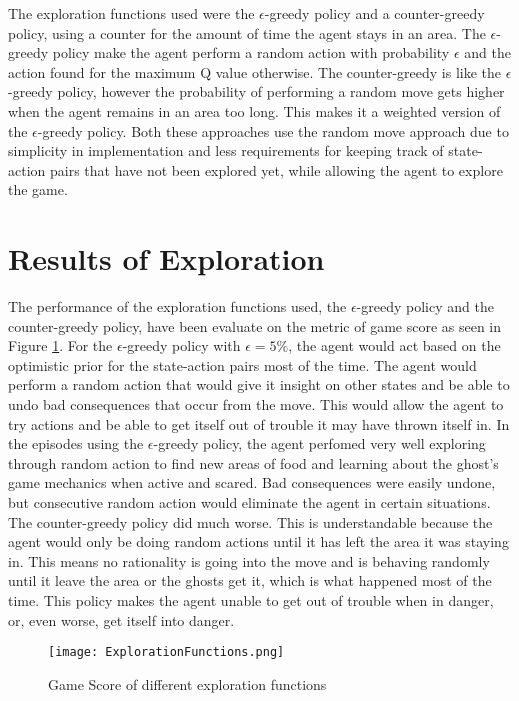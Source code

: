 \documentclass[11pt]{scrartcl}
\begin{document}
The exploration functions used were the $\epsilon$-greedy policy and a counter-greedy policy, using a counter for the amount of time the agent stays in an area. The $\epsilon$-greedy policy make the agent perform a random action with probability $\epsilon$ and the action found for the maximum Q value otherwise. The counter-greedy is like the $\epsilon$-greedy policy, however the probability of performing a random move gets higher when the agent remains in an area too long. This makes it a weighted version of the $\epsilon$-greedy policy. Both these approaches use the random move approach due to simplicity in implementation and less requirements for keeping track of state-action pairs that have not been explored yet, while allowing the agent to explore the game.

\section{Results of Exploration}

The performance of the exploration functions used, the $\epsilon$-greedy policy and the counter-greedy policy, have been evaluate on the metric of game score as seen in Figure \ref{fig:F2}. For the $\epsilon$-greedy policy with $\epsilon = 5\%$, the agent would act based on the optimistic prior for the state-action pairs most of the time. The agent would perform a random action that would give it insight on other states and be able to undo bad consequences that occur from the move. This would allow the agent to try actions and be able to get itself out of trouble it may have thrown itself in. In the episodes using the $\epsilon$-greedy policy, the agent perfomed very well exploring through random action to find new areas of food and learning about the ghost's game mechanics when active and scared. Bad consequences were easily undone, but consecutive random action would eliminate the agent in certain situations. The counter-greedy policy did much worse. This is understandable because the agent would only be doing random actions until it has left the area it was staying in. This means no rationality is going into the move and is behaving randomly until it leave the area or the ghosts get it, which is what happened most of the time. This policy makes the agent unable to get out of trouble when in danger, or, even worse, get itself into danger. 

\begin{figure}[ht]
\centering	
\texttt{[image: ExplorationFunctions.png]}	
\caption{Game Score of different exploration functions}
\label{fig:F2}
\end{figure}
\end{document}
